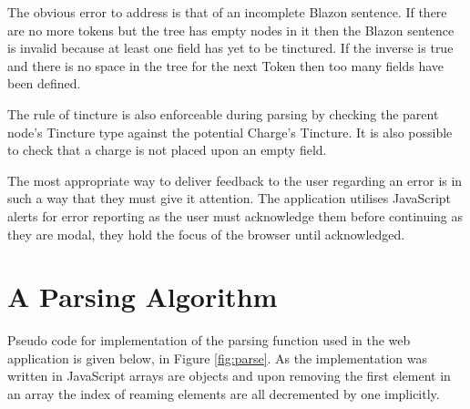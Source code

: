 The obvious error to address is that of an incomplete Blazon sentence.  If there are no more tokens but the tree has empty nodes in it then the Blazon sentence is invalid because at least one field has yet to be tinctured.  If the inverse is true and there is no space in the tree for the next Token then too many fields have been defined.

The rule of tincture is also enforceable during parsing by checking the parent node's Tincture type against the potential Charge's Tincture.   It is also possible to check that a charge is not placed upon an empty field. 

The most appropriate way to deliver feedback to the user regarding an error is in such a way that they must give it attention.  The application utilises JavaScript alerts for error reporting as the user must acknowledge them before continuing as they are modal, they hold the focus of the browser until acknowledged. 


\section{A Parsing Algorithm}

Pseudo code for implementation of the parsing function used in the web application is given below, in Figure \ref{fig:parse}.  As the implementation was written in JavaScript arrays are objects and upon removing the first element in an array the index of reaming elements are all decremented by one implicitly. 

